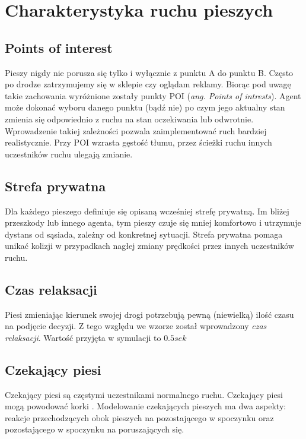 \chapter{Charakterystyka ruchu pieszych}
\label{cha:charakterystykaRuchu}

\section{Points of interest}
\label{sec:pointsOfInterest}

Pieszy nigdy nie porusza się tylko i wyłącznie z punktu A do punktu B. Często po drodze zatrzymujemy się w sklepie czy oglądam reklamy. Biorąc pod uwagę takie zachowania wyróżnione zostały punkty POI (\textit{ang. Points of intrests}). Agent może dokonać wyboru danego punktu (bądź nie) po czym jego aktualny stan zmienia się odpowiednio z ruchu na stan oczekiwania lub odwrotnie. Wprowadzenie takiej zależności pozwala zaimplementować ruch bardziej realistycznie. Przy POI wzrasta gęstość tłumu, przez ścieżki ruchu innych uczestników ruchu ulegają zmianie.
 
\section{Strefa prywatna}
\label{sec:strefaPryw}

Dla każdego pieszego definiuje się opisaną wcześniej strefę prywatną. Im bliżej przeszkody lub innego agenta, tym pieszy czuje się mniej komfortowo i utrzymuje dystans od sąsiada, zależny od konkretnej sytuacji. Strefa prywatna pomaga unikać kolizji w przypadkach nagłej zmiany prędkości przez innych uczestników ruchu.

\section{Czas relaksacji}
\label{sec:czasRelaksacji}

Piesi zmieniając kierunek swojej drogi potrzebują pewną (niewielką) ilość czasu na podjęcie decyzji. Z tego względu we wzorze został wprowadzony \textit{czas relaksacji}. Wartość przyjęta w symulacji to $0.5 sek$

\section{Czekający piesi}
\label{sec:czekajacyPiesi}

Czekający piesi są częstymi uczestnikami normalnego ruchu. Czekający piesi mogą powodować korki \cite{6}. Modelowanie czekających pieszych ma dwa aspekty: reakcje  przechodzących obok pieszych na pozostającego w spoczynku oraz pozostającego w spoczynku na poruszających się.

